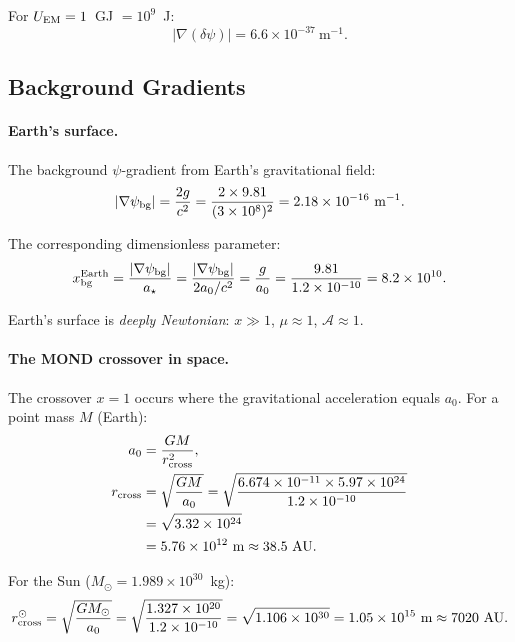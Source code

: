 \documentclass[aps,prd,twocolumn,superscriptaddress,nofootinbib]{revtex4-2}
\newcommand{\astar}{a_\star}
\newcommand{\ee}[1]{\times 10^{#1}}
\begin{document}
For $U_{\rm EM} = 1$~GJ $= 10^9$~J:
\begin{equation}
|\nabla(\delta\psi)| = 6.6\ee{-37}~\text{m}^{-1}.
\end{equation}

\subsection{Background Gradients}

\paragraph{Earth's surface.}
The background $\psi$-gradient from Earth's gravitational field:
\begin{equation}
|\nabla\psi_{\rm bg}| = \frac{2g}{c^2} = \frac{2 \times 9.81}{(3\ee{8})^2}
= 2.18\ee{-16}~\text{m}^{-1}.
\end{equation}

The corresponding dimensionless parameter:
\begin{equation}
x_{\rm bg}^{\rm Earth} = \frac{|\nabla\psi_{\rm bg}|}{\astar}
= \frac{|\nabla\psi_{\rm bg}|}{2a_0/c^2}
= \frac{g}{a_0}
= \frac{9.81}{1.2\ee{-10}}
= 8.2\ee{10}.
\end{equation}

Earth's surface is \emph{deeply Newtonian}: $x \gg 1$,
$\mu \approx 1$, $\mathcal{A} \approx 1$.

\paragraph{The MOND crossover in space.}
The crossover $x = 1$ occurs where the gravitational acceleration
equals $a_0$.  For a point mass $M$ (Earth):
\begin{align}
a_0 &= \frac{GM}{r_{\rm cross}^2}, \notag\\
r_{\rm cross} &= \sqrt{\frac{GM}{a_0}}
= \sqrt{\frac{6.674\ee{-11}\times 5.97\ee{24}}{1.2\ee{-10}}} \notag\\
&= \sqrt{3.32\ee{24}} \notag\\
&= 5.76\ee{12}~\text{m} \approx 38.5~\text{AU}.
\end{align}

For the Sun ($M_\odot = 1.989\ee{30}$~kg):
\begin{equation}
r_{\rm cross}^{\odot} = \sqrt{\frac{GM_\odot}{a_0}}
= \sqrt{\frac{1.327\ee{20}}{1.2\ee{-10}}}
= \sqrt{1.106\ee{30}}
= 1.05\ee{15}~\text{m} \approx 7020~\text{AU}.
\end{equation}
\end{document}
